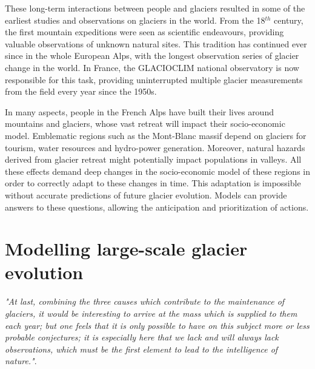 These long-term interactions between people and glaciers resulted in some of the earliest studies and observations on glaciers in the world. From the 18$^{th}$ century, the first mountain expeditions were seen as scientific endeavours, providing valuable observations of unknown natural sites. This tradition has continued ever since in the whole European Alps, with the longest observation series of glacier change in the world. In France, the GLACIOCLIM national observatory is now responsible for this task, providing uninterrupted multiple glacier measurements from the field every year since the 1950s.

In many aspects, people in the French Alps have built their lives around mountains and glaciers, whose vast retreat will impact their socio-economic model. Emblematic regions such as the Mont-Blanc massif depend on glaciers for tourism, water resources and hydro-power generation. Moreover, natural hazards derived from glacier retreat might potentially impact populations in valleys. All these effects demand deep changes in the socio-economic model of these regions in order to correctly adapt to these changes in time. This adaptation is impossible without accurate predictions of future glacier evolution. Models can provide answers to these questions, allowing the anticipation and prioritization of actions.

\section{Modelling large-scale glacier evolution}

\emph{"At last, combining the three causes which contribute to the maintenance of glaciers, it would be interesting to arrive at the mass which is supplied to them each year; but one feels that it is only possible to have on this subject more or less probable conjectures; it is especially here that we lack and will always lack observations, which must be the first element to lead to the intelligence of nature."}.


